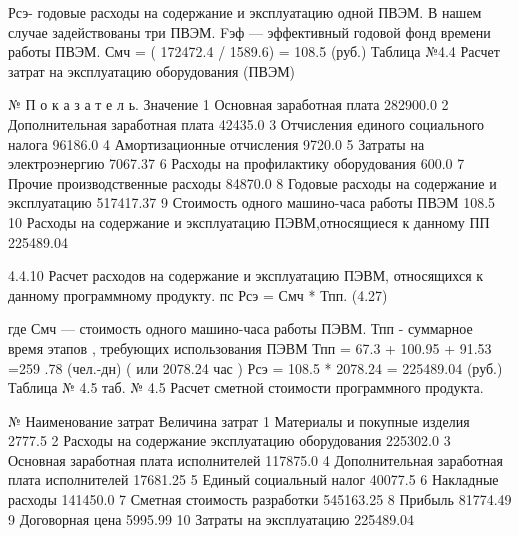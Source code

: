 \begin{ESKDexplanation}
\begin{ESKDexplanation}
\begin{ESKDexplanation}
\begin{ESKDexplanation}
   Рсэ- годовые расходы на содержание и эксплуатацию одной ПВЭМ.
                В нашем случае задействованы три ПВЭМ.
   Fэф — эффективный годовой фонд времени работы ПВЭМ.
   Смч = ( 172472.4 / 1589.6) = 108.5 (руб.)
                                                                                                                 Таблица №4.4
 Расчет затрат на эксплуатацию оборудования (ПВЭМ)

№
П о к а з а т е л ь.
Значение
1
Основная заработная плата
282900.0
2
Дополнительная заработная плата
42435.0
3
Отчисления единого социального налога
96186.0
4
Амортизационные отчисления
9720.0
5
Затраты на электроэнергию
7067.37
6
Расходы на профилактику оборудования
600.0
7
Прочие производственные расходы
84870.0
8
Годовые расходы на содержание и эксплуатацию
517417.37
9
Стоимость одного машино-часа работы ПВЭМ
108.5
10
Расходы на содержание и эксплуатацию ПЭВМ,относящиеся к данному ПП
225489.04


4.4.10  Расчет расходов на содержание и эксплуатацию ПЭВМ,       относящихся к данному программному продукту.
                                          пс   
                                              Рсэ = Смч * Тпп.                                                     (4.27)

где Смч —  стоимость одного машино-часа работы ПЭВМ.
Тпп -    суммарное время этапов , требующих использования ПЭВМ
Тпп =  67.3 + 100.95 + 91.53 =259 .78 (чел.-дн)   (  или 2078.24 час )
Рсэ =  108.5 * 2078.24 = 225489.04 (руб.)
                                                                                                                Таблица № 4.5
           таб. № 4.5  Расчет сметной стоимости программного продукта.

№
Наименование затрат
Величина затрат
1
Материалы и покупные изделия
2777.5
2
Расходы на содержание эксплуатацию оборудования
225302.0
3
Основная заработная плата исполнителей
117875.0
4
Дополнительная заработная плата исполнителей
17681.25
5
Единый социальный налог
40077.5
6
Накладные расходы
141450.0
7
Сметная стоимость разработки
545163.25
8
Прибыль
81774.49
9
Договорная цена
5995.99
10
Затраты на эксплуатацию
225489.04


\end{ESKDexplanation}
\end{ESKDexplanation}
\end{ESKDexplanation}
\end{ESKDexplanation}
